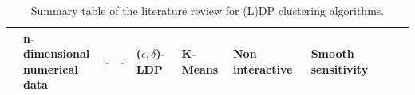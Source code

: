 \begin{landscape}
\begin{table}[ht]
\begin{tabular}{rlllllllll}
      \citep{nissim_smooth_2007}                 & \makecell[l]{n-dimensional                                                                                                                          \\ numerical data}             & -                                                  & -                                                  & ($\epsilon, \delta$)-LDP & K-Means             & Non interactive & Smooth sensitivity               \\
      \bottomrule
    \end{tabular}
    \caption{Summary table of the literature review for (L)DP clustering algorithms.}
    \label{tab:summary_table_kmeans}
  \end{table}


  \begin{table}[ht]
    \centering


\end{table}
\end{landscape}
